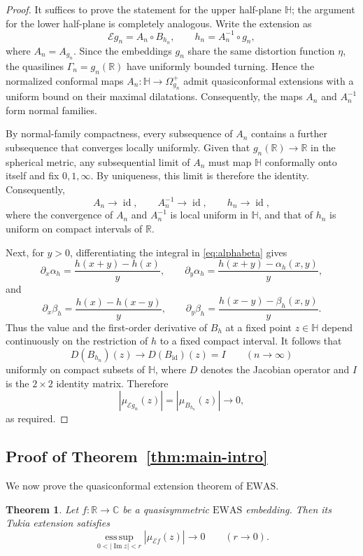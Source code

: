 \documentclass[11pt]{amsart}
\numberwithin{equation}{section}
\newtheorem{theorem}{Theorem}[section]
\theoremstyle{definition} %
\theoremstyle{remarkstyle}
\newcommand{\R}{\mathbb{R}}
\newcommand{\C}{\mathbb{C}}
\newcommand{\Hh}{\mathbb{H}}
\newcommand{\id}{\operatorname{id}}
\newcommand{\esssup}{\operatorname*{ess\,sup}}
\begin{document}
\begin{proof}
It suffices to prove the statement for the upper half-plane $\mathbb{H}$; the argument for the lower half-plane is completely analogous.
Write the extension as
\[
 \mathcal Eg_n=A_n\circ B_{h_n},
 \qquad h_n=A_n^{-1}\circ g_n,
\]
where $A_n=A_{g_n}$. 
Since the embeddings $g_n$ share the same distortion function $\eta$, the quasilines $\Gamma_n = g_n(\mathbb{R})$ have uniformly bounded turning.
Hence the normalized conformal maps $A_n\colon\mathbb H\to\Omega_{g_n}^+$ admit quasiconformal extensions with a uniform bound on their maximal dilatations. 
Consequently, the maps $A_n$ and $A_n^{-1}$ form normal families.

By normal-family compactness, every subsequence of $A_n$ contains a further subsequence that converges locally uniformly. 
Given that $g_n(\mathbb{R}) \to \mathbb{R}$ in the spherical metric, any subsequential limit of $A_n$ must map $\mathbb{H}$ conformally onto itself and fix $0, 1, \infty$. 
By uniqueness, this limit is therefore the identity. 
Consequently, 
\[
 A_n\to\id,
 \qquad A_n^{-1}\to\id,
 \qquad h_n\to\id,
\]
where the convergence of $A_n$ and $A_n^{-1}$ is local uniform in $\mathbb{H}$, and that of $h_n$ is uniform on compact intervals of $\mathbb{R}$.

Next, for $y>0$, differentiating the integral in \eqref{eq:alphabeta} gives
\[
 \partial_x\alpha_h=\frac{h(x+y)-h(x)}{y},\qquad\partial_y\alpha_h=\frac{h(x+y)-\alpha_h(x,y)}{y},
\]
and
\[
 \partial_x\beta_h=\frac{h(x)-h(x-y)}{y},\qquad\partial_y\beta_h=\frac{h(x-y)-\beta_h(x,y)}{y}.
\]
Thus the value and the first-order derivative of $B_h$ at a fixed point $z \in \mathbb H$
depend continuously on the restriction of $h$ to a fixed compact interval.  
It follows that
\[
 D(B_{h_n})(z)\to
 D(B_{\id})(z)=I \qquad (n\to\infty)
\]
uniformly on compact subsets of $\Hh$, where $D$ denotes the Jacobian operator and $I$ is the $2\times2$ identity matrix.  
Therefore
\[
 |\mu_{\mathcal Eg_n}(z)|
 =|\mu_{B_{h_n}}(z)|\to 0,
\]
as required.
\end{proof}

\subsection{Proof of Theorem~\ref{thm:main-intro}}

We now prove the quasiconformal extension theorem of $\mathrm{EWAS}$.

\begin{theorem}\label{thm:Esharp-AC}
Let $f\colon\R\to\C$ be a quasisymmetric $\mathrm{EWAS}$ embedding. 
Then its Tukia extension satisfies
\[
\esssup_{0<|\operatorname{Im}z|<r}
|\mu_{\mathcal Ef}(z)| \to 0 \qquad (r \to 0).
\]
\end{theorem}
\end{document}

